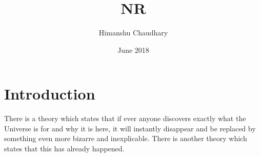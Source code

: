 \documentclass{article}
\title{NR}
\author{Himanshu Chaudhary}
\date{June 2018}
\begin{document}
\maketitle

\section{Introduction}
There is a theory which states that if ever anyone discovers exactly what the Universe is for and why it is here, it will instantly disappear and be replaced by something even more bizarre and inexplicable.
There is another theory which states that this has already happened.
\end{document}
